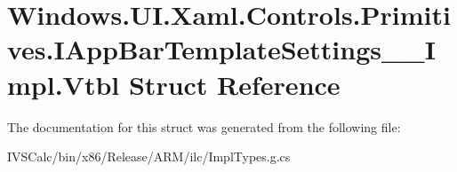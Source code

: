 \hypertarget{struct_windows_1_1_u_i_1_1_xaml_1_1_controls_1_1_primitives_1_1_i_app_bar_template_settings_____impl_1_1_vtbl}{}\section{Windows.\+U\+I.\+Xaml.\+Controls.\+Primitives.\+I\+App\+Bar\+Template\+Settings\+\_\+\+\_\+\+Impl.\+Vtbl Struct Reference}
\label{struct_windows_1_1_u_i_1_1_xaml_1_1_controls_1_1_primitives_1_1_i_app_bar_template_settings_____impl_1_1_vtbl}


The documentation for this struct was generated from the following file\+:\begin{DoxyCompactItemize}
\item 
I\+V\+S\+Calc/bin/x86/\+Release/\+A\+R\+M/ilc/Impl\+Types.\+g.\+cs\end{DoxyCompactItemize}
